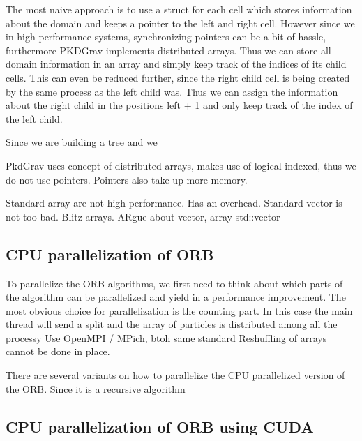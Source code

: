 \documentclass[]{article}
\begin{document}
The most naive approach is to use a struct for each cell which stores information about the domain and keeps a pointer to the left and right cell. However since we in high performance systems, synchronizing pointers can be a bit of hassle, furthermore PKDGrav implements distributed arrays. Thus we can store all domain information in an array and simply keep track of the indices of its child cells. This can even be reduced further, since the right child cell is being created by the same process as the left child was. Thus we can assign the information about the right child in the positions left + 1 and only keep track of the index of the left child.

Since we are building a tree and we 


PkdGrav uses concept of distributed arrays, makes use of logical indexed, thus we do not use pointers. Pointers also take up more memory. 

Standard array are not high performance. Has an overhead. Standard vector is not too bad. Blitz arrays. 
ARgue about vector, array std::vector

\subsection{CPU parallelization of ORB}

To parallelize the ORB algorithms, we first need to think about which parts of the algorithm can be parallelized and yield in a performance improvement. The most obvious choice for parallelization is the counting part. In this case the main thread will send a split and the array of particles is distributed among all the processy
Use OpenMPI / MPich, btoh same standard
Reshuffling of arrays cannot be done in place.

There are several variants on how to parallelize the CPU parallelized version of the ORB. Since it is a recursive algorithm 


\subsection{CPU parallelization of ORB using CUDA }


\end{document}
